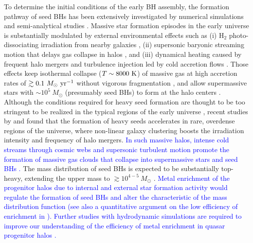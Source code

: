 \documentclass[twocolumn, twocolappendix]{aastex63}
\newcommand{\Msun}{M_\odot}
\newcommand{\Msunyr}{M_\odot~{\rm yr}^{-1}}
\newcommand{\blue}[1]{\textcolor{blue}{ #1}}
\begin{document}
\begin{CJK*}{UTF8}{gbsn}
To determine the initial conditions of the early BH assembly,
the formation pathway of seed BHs has been extensively investigated by numerical simulations and semi-analytical studies
\citep{2006MNRAS.370..289B,2009MNRAS.396..343R,2009ApJ...696.1798T,2012MNRAS.422.2051N,2014ApJ...781...60H,
2015MNRAS.448..568H,2018MNRAS.474.3825V,2021MNRAS.506..613S,2023MNRAS.518.1601T,2022MNRAS.516..138B}.
Massive star formation episodes in the early universe is substantially modulated by external environmental effects such as
(i) H$_2$ photo-dissociating irradiation from nearby galaxies
\citep{2001ApJ...546..635O,2002ApJ...569..558O,2003Natur.425..812B,2010MNRAS.402.1249S,2014MNRAS.445..544S,2014MNRAS.445..107V,2016ApJ...832..134C},
(ii) supersonic baryonic streaming motion that delays gas collapse in halos
\citep{2012MNRAS.424.1335F, 2014MNRAS.439.1092T, 2018ApJ...855...17H,2017MNRAS.471.4878S,2018MNRAS.479.4017I},
and (iii) dynamical heating caused by frequent halo mergers and turbulence injection led by cold accretion flows
\citep{2003ApJ...592..645Y,2010Natur.466.1082M,2015ApJ...810...51M,2019Natur.566...85W,2022Natur.607...48L}.
Those effects keep isothermal collapse ($T\sim 8000~{\rm K}$) of massive gas at high accretion rates of $\gtrsim 0.1~\Msunyr$
without vigorous fragmentation \citep{2014MNRAS.445L.109I,2015MNRAS.446.2380B,2016PASA...33...51L},
and allow supermassive stars with $\sim 10^5~\Msun$ (presumably seed BHs) to form at the halo centers 
\citep{2013ApJ...778..178H,2013A&A...558A..59S,2019PASA...36...27W,2023MNRAS.518.1601T}.
Although the conditions required for heavy seed formation are thought to be too stringent to be realized in the typical regions of the early universe
\citep{2008MNRAS.391.1961D,2009ApJ...695.1430A,2015MNRAS.450.4350I},
recent studies by \citet{2021MNRAS.503.5046L} and \citet{2021ApJ...917...60L} found that the formation of heavy seeds
accelerates in rare, overdense regions of the universe, where non-linear galaxy clustering boosts the irradiation intensity
and frequency of halo mergers.
\blue{In such massive halos, intense cold streams through cosmic webs and supersonic turbulent motion promote the formation
of massive gas clouds that collapse into supermassive stars and seed BHs \citep{2009Natur.457..451D,2012MNRAS.422.2539I,2022Natur.607...48L}.}
The mass distribution of seed BHs is expected to be substantially top-heavy, extending the upper mass to $\gtrsim 10^{4-5}~\Msun$
\citep{2021ApJ...917...60L, 2023MNRAS.518.1601T}.
\blue{
Metal enrichment of the progenitor halos due to internal and external star formation activity would regulate the formation of 
seed BHs and alter the characteristic of the mass distribution function (see also a quantitative argument on the low efficiency of enrichment in 
\citealt{2021ApJ...917...60L}).
Further studies with hydrodynamic simulations are required to improve our understanding of the efficiency of metal enrichment in quasar progenitor halos
\citep[e.g.,][]{2018MNRAS.475.4378C}.
}



\end{CJK*}
\end{document}
